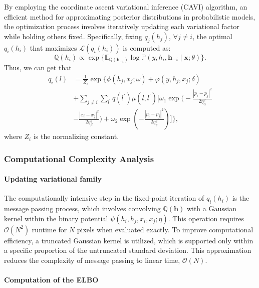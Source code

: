 \documentclass[conference]{IEEEtran}
\newcommand{\EE}{{\mathbb{E}}}
\newcommand{\hb}{\mathbf{h}}
\newcommand{\Lc}{\mathcal{L}}
\newcommand{\PP}{{\mathbb{P}}}
\newcommand{\QQ}{{\mathbb{Q}}}
\newcommand{\xb}{\mathbf{x}}
\newcommand{\Oc}{\mathcal{O}}
\let\oldsubsubsection\subsubsection
\renewcommand{\subsubsection}[1]{\oldsubsubsection{\textbf{#1}}}
\begin{document}
By employing the coordinate ascent variational inference (CAVI) algorithm,
an efficient method for approximating posterior distributions in probabilistic
models, the optimization process involves iteratively updating each variational
factor while holding others fixed. Specifically, fixing $q_j(h_j)$,
$\forall j \neq i$, the optimal $q_i(h_i)$ that maximizes $\Lc(q_i(h_i))$
is computed as:
\begin{equation*}
\QQ(h_i) \propto \exp\{\EE_{\QQ(\hb_{-i})}
\log\PP(y, h_i, \hb_{-i} \mid \xb; \theta)\}.
\end{equation*}
Thus, we can get that
\begin{equation*}
\begin{split}
q_i(l) &= \frac{1}{Z_i} \exp \Bigg\{
\phi(h_j, x_j; \omega) + \varphi(y, h_j, x_j; \delta) \\
&+ \sum_{j \neq i} \sum_{l^\prime} q(l^\prime) \mu(l, l^\prime) 
\Bigg[ \omega_1 \exp \bigg(
- \frac{\left\lvert p_i - p_j \right\rvert^2}{2\eta_\alpha^2}\\
&- \frac{\left\lvert x_i - x_j \right\rvert^2}{2\eta_\beta^2}
\bigg)
+ \omega_2 \exp \left(
- \frac{\left\lvert p_i - p_j 
\right\rvert^2}{2\eta_\gamma^2}
\right)
\Bigg]
\Bigg\},
\end{split}
\end{equation*}
where $Z_i$ is the normalizing constant.


\subsubsection{Computational Complexity Analysis}


\paragraph{Updating variational family}


The computationally intensive step in the fixed-point iteration of $q_i(h_i)$
is the message passing process, which involves convolving $\QQ(\hb)$ with a
Gaussian kernel within the binary potential $\psi(h_i, h_j, x_i, x_j; \eta)$.
This operation requires $\Oc(N^2)$ runtime for $N$ pixels when evaluated
exactly. To improve computational efficiency, a truncated Gaussian kernel is
utilized, which is supported only within a specific proportion of the
untruncated standard deviation. This approximation reduces the complexity of 
message passing to linear time, $\Oc(N)$.


\paragraph{Computation of the ELBO}
\end{document}
